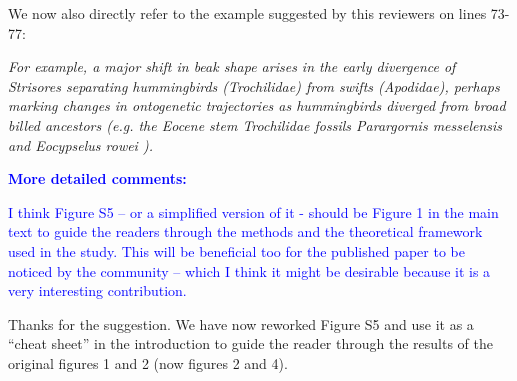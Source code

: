 \documentclass[12pt,letterpaper]{article}
\begin{document}
We now also directly refer to the example suggested by this reviewers on lines 73-77:%

\noindent\textit{For example, a major shift in beak shape arises in the early divergence of Strisores separating hummingbirds (Trochilidae) from swifts (Apodidae), perhaps marking changes in ontogenetic trajectories \cite{navalon2021} as hummingbirds diverged from broad billed ancestors (e.g. the Eocene stem Trochilidae fossils \textit{Parargornis messelensis} and \textit{Eocypselus rowei} \cite{mayr2003new, ksepka2013fossil}).} %


\textbf{\textcolor{blue}{More detailed comments:}}

\textcolor{blue}{I think Figure S5 – or a simplified version of it - should be Figure 1 in the main text to guide the readers through the methods and the theoretical framework used in the study. This will be beneficial too for the published paper to be noticed by the community – which I think it might be desirable because it is a very interesting contribution.}

Thanks for the suggestion. We have now reworked Figure S5 and use it as a “cheat sheet” in the introduction to guide the reader through the results of the original figures 1 and 2 (now figures 2 and 4).
\end{document}
